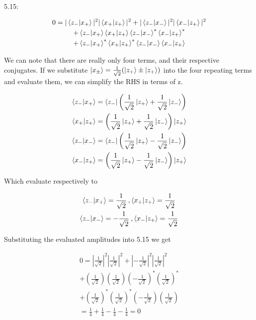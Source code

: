 \documentclass{article}
\begin{document}
    5.15:

    \begin{gather*}
        0 = |\braket{z_-|x_+}|^2|\braket{x_+|z_+}|^2 + |\braket{z_-|x_-}|^2|\braket{x_-|z_+}|^2\\
          + \braket{z_-|x_+}\braket{x_+|z_+}\braket{z_-|x_-}^*\braket{x_-|z_+}^*\\
          + \braket{z_-|x_+}^*\braket{x_+|z_+}^*\braket{z_-|x_-}\braket{x_-|z_+}
    \end{gather*}

    We can note that there are really only four terms, and their respective conjugates.
    If we substitute $\ket{x_\pm} = \frac{1}{\sqrt{2}}(\ket{z_+} \pm \ket{z_+})$ into the four repeating terms and evaluate them,
    we can simplify the RHS in terms of z.

    \begin{gather}
        \braket{z_-|x_+} = \bra{z_-}\left( \frac{1}{\sqrt{2}}\ket{z_+} + \frac{1}{\sqrt{2}}\ket{z_-} \right)\\
        \braket{x_+|z_+} = \left( \frac{1}{\sqrt{2}}\ket{z_+} + \frac{1}{\sqrt{2}}\ket{z_-} \right)\ket{z_+}\\
        \braket{z_-|x_-} = \bra{z_-}\left( \frac{1}{\sqrt{2}}\ket{z_+} - \frac{1}{\sqrt{2}}\ket{z_-} \right)\\
        \braket{x_-|z_+} = \left( \frac{1}{\sqrt{2}}\ket{z_+} - \frac{1}{\sqrt{2}}\ket{z_-} \right)\ket{z_+}
    \end{gather}

    Which evaluate respectively to

    \begin{gather}
        \braket{z_-|x_+} = \frac{1}{\sqrt{2}}\:,
        \braket{x_+|z_+} = \frac{1}{\sqrt{2}}\\
        \braket{z_-|x_-} = -\frac{1}{\sqrt{2}}\:,
        \braket{x_-|z_+} = \frac{1}{\sqrt{2}}
    \end{gather}

    Substituting the evaluated amplitudes into 5.15 we get

    \begin{gather*}
        0 = |\frac{1}{\sqrt{2}}|^2|\frac{1}{\sqrt{2}}|^2 + |-\frac{1}{\sqrt{2}}|^2|\frac{1}{\sqrt{2}}|^2\\
          + (\frac{1}{\sqrt{2}})(\frac{1}{\sqrt{2}})(-\frac{1}{\sqrt{2}})^*(\frac{1}{\sqrt{2}})^*\\
          + (\frac{1}{\sqrt{2}})^*(\frac{1}{\sqrt{2}})^*(-\frac{1}{\sqrt{2}})(\frac{1}{\sqrt{2}})\\
          = \frac{1}{4} + \frac{1}{4} - \frac{1}{4} - \frac{1}{4} = 0
    \end{gather*}
\end{document}

